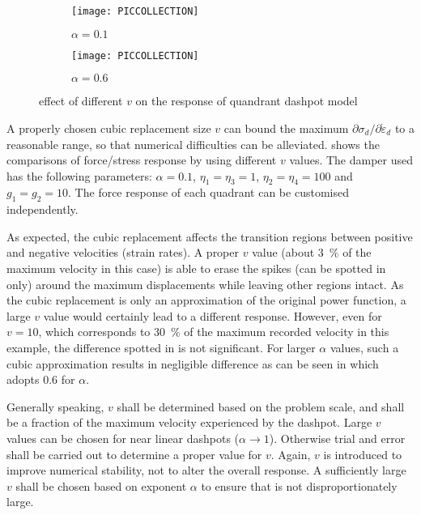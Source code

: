 \begin{figure}[htb]
\centering\scriptsize
\begin{subfigure}{.49\textwidth}\centering
\texttt{[image: PICCOLLECTION]}
\caption{$\alpha=0.1$}\label{fig:para_a}
\end{subfigure}\hfill
\begin{subfigure}{.49\textwidth}\centering
\texttt{[image: PICCOLLECTION]}
\caption{$\alpha=0.6$}\label{fig:para_b}
\end{subfigure}
\caption{effect of different $v$ on the response of quandrant dashpot model}
\end{figure}
A properly chosen cubic replacement size $v$ can bound the maximum $\partial\sigma_d/\partial\dot\varepsilon_d$ to a reasonable range, so that numerical difficulties can be alleviated.  shows the comparisons of force/stress response by using different $v$ values. The damper used has the following parameters: $\alpha=0.1$, $\eta_1=\eta_3=1$, $\eta_2=\eta_4=100$ and $g_1=g_2=10$. The force response of each quadrant can be customised independently.

As expected, the cubic replacement affects the transition regions between positive and negative velocities (strain rates). A proper $v$ value (about \SI{3}{\percent} of the maximum velocity in this case) is able to erase the spikes (can be spotted in  only) around the maximum displacements while leaving other regions intact. As the cubic replacement is only an approximation of the original power function, a large $v$ value would certainly lead to a different response. However, even for $v=10$, which corresponds to \SI{30}{\percent} of the maximum recorded velocity in this example, the difference spotted in  is not significant. For larger $\alpha$ values, such a cubic approximation results in negligible difference as can be seen in  which adopts \num{0.6} for $\alpha$.

Generally speaking, $v$ shall be determined based on the problem scale, and shall be a fraction of the maximum velocity experienced by the dashpot. Large $v$ values can be chosen for near linear dashpots ($\alpha\rightarrow1$). Otherwise trial and error shall be carried out to determine a proper value for $v$. Again, $v$ is introduced to improve numerical stability, not to alter the overall response. A sufficiently large $v$ shall be chosen based on exponent $\alpha$ to ensure that  is not disproportionately large.
